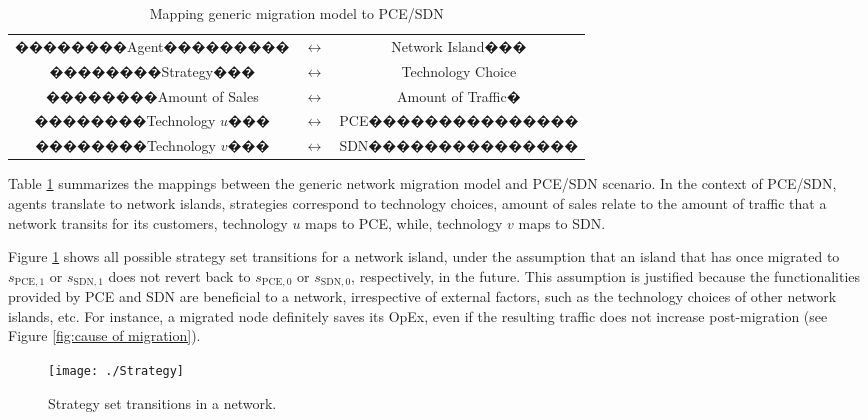 \documentclass[smallextended]{svjour3}
\begin{document}
\begin{table}[ht]
\centering \begin{tabular}{c c c} ��������Agent��������� &	$\longleftrightarrow$	& 	Network Island��� \\
��������Strategy��� &	$\longleftrightarrow$	& 	 Technology Choice \\
��������Amount of Sales &	$\longleftrightarrow$	& 	 Amount of Traffic� \\
��������Technology $u$��� &	$\longleftrightarrow$	& 	 PCE��������������� \\
��������Technology $v$��� &	$\longleftrightarrow$	& 	 SDN���������������
\end{tabular}
\caption{Mapping generic migration model to PCE/SDN} \label{table: mapping generic model to pce/sdn} \end{table}

\par Table \ref{table: mapping generic model to pce/sdn} summarizes the mappings
between the generic network migration model and PCE/SDN scenario. In the context
of PCE/SDN, agents translate to network islands, strategies correspond to
technology choices, amount of sales relate to the amount of traffic that a
network transits for its customers, technology $u$ maps to PCE, while,
technology $v$ maps to SDN.

\par Figure \ref{fig:StrategySetTransitions} shows all
possible strategy set transitions for a network island, under the assumption that an
island that has once migrated to $s_{\textrm{PCE},1}$ or $s_{\textrm{SDN},1}$
does not revert back to $s_{\textrm{PCE},0}$ or $s_{\textrm{SDN},0}$,
respectively, in the future. This assumption is justified because the
functionalities provided by PCE and SDN are beneficial to a network, irrespective
of external factors, such as the technology choices of other network islands,
etc.
For instance, a migrated node definitely saves its OpEx, even if the resulting
traffic does not increase post-migration (see Figure \ref{fig:cause of migration}).

\begin{figure} [!hbt]
\begin{center}
\texttt{[image: ./Strategy]}
\label{fig:str}
\end{center}
\caption{Strategy set transitions in a network.}
\label{fig:StrategySetTransitions}
\end{figure}
\end{document}
